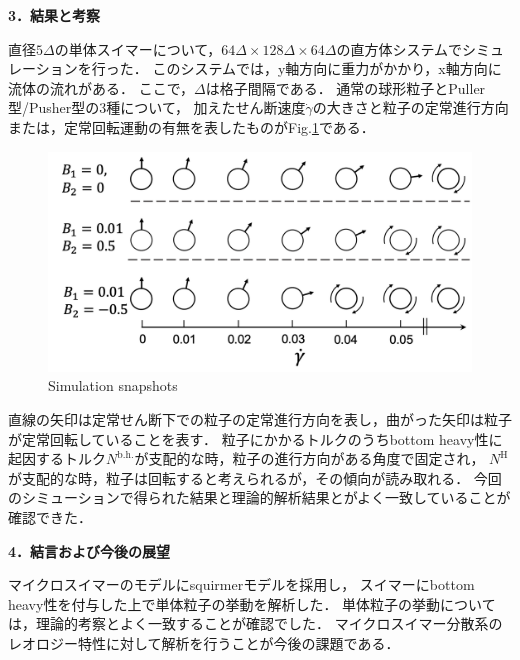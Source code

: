 \documentclass[twocolumns,10pt,a4j]{jarticle}
\begin{document}
  \vspace{1.0truemm}
  \noindent
  {\bf \large 3．結果と考察}
  \par
直径$5\Delta$の単体スイマーについて，$64\Delta \times 128\Delta \times 64\Delta$の直方体システムでシミュレーションを行った．
このシステムでは，y軸方向に重力がかかり，x軸方向に流体の流れがある．
ここで，$\Delta$は格子間隔である．
通常の球形粒子とPuller型/Pusher型の3種について，
加えたせん断速度$\dot{\gamma}$の大きさと粒子の定常進行方向または，定常回転運動の有無を表したものがFig.\ref{snapshots}である．
  \vspace{-3truemm}
  \begin{figure}[h]
    \hspace{-3truemm}
    \centering
    \includegraphics[width=80truemm]{./images/rotation.png}
    \vspace{-6truemm}
    \hspace{-2truemm}
    \caption{Simulation snapshots}
    \label{snapshots}
  \end{figure}
  \vspace{-3truemm}

  \noindent
直線の矢印は定常せん断下での粒子の定常進行方向を表し，曲がった矢印は粒子が定常回転していることを表す．
粒子にかかるトルクのうちbottom heavy性に起因するトルク$N^\mathrm{b.h.}$が支配的な時，粒子の進行方向がある角度で固定され，
$N^\mathrm{H}$が支配的な時，粒子は回転すると考えられるが，その傾向が読み取れる．
今回のシミューションで得られた結果と理論的解析結果とがよく一致していることが確認できた．


  \vspace{1.0truemm}
  \noindent
  \textbf{\large 4．結言および今後の展望}
  \par
マイクロスイマーのモデルにsquirmerモデルを採用し，
スイマーにbottom heavy性を付与した上で単体粒子の挙動を解析した．
単体粒子の挙動については，理論的考察とよく一致することが確認でした．
マイクロスイマー分散系のレオロジー特性に対して解析を行うことが今後の課題である．
  \vspace{-5truemm}
\end{document}
